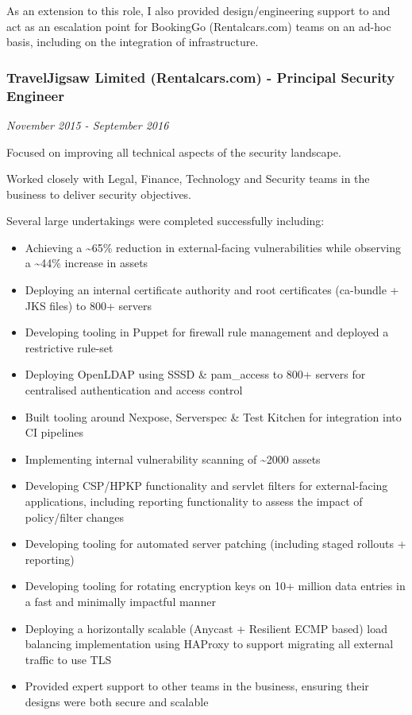 As an extension to this role, I also provided design/engineering support
to and act as an escalation point for BookingGo (Rentalcars.com) teams
on an ad-hoc basis, including on the integration of infrastructure.

\hypertarget{traveljigsaw-limited-rentalcars.com---principal-security-engineer}{%
\subsubsection{TravelJigsaw Limited (Rentalcars.com) - Principal
Security
Engineer}\label{traveljigsaw-limited-rentalcars.com---principal-security-engineer}}

\emph{November 2015 - September 2016}

Focused on improving all technical aspects of the security landscape.

Worked closely with Legal, Finance, Technology and Security teams in the
business to deliver security objectives.

Several large undertakings were completed successfully including:

\begin{itemize}
\tightlist
\item
  Achieving a \textasciitilde{}65\% reduction in external-facing
  vulnerabilities while observing a \textasciitilde{}44\% increase in
  assets
\item
  Deploying an internal certificate authority and root certificates
  (ca-bundle + JKS files) to 800+ servers
\item
  Developing tooling in Puppet for firewall rule management and deployed
  a restrictive rule-set
\item
  Deploying OpenLDAP using SSSD \& pam\_access to 800+ servers for
  centralised authentication and access control
\item
  Built tooling around Nexpose, Serverspec \& Test Kitchen for
  integration into CI pipelines
\item
  Implementing internal vulnerability scanning of \textasciitilde{}2000
  assets
\item
  Developing CSP/HPKP functionality and servlet filters for
  external-facing applications, including reporting functionality to
  assess the impact of policy/filter changes
\item
  Developing tooling for automated server patching (including staged
  rollouts + reporting)
\item
  Developing tooling for rotating encryption keys on 10+ million data
  entries in a fast and minimally impactful manner
\item
  Deploying a horizontally scalable (Anycast + Resilient ECMP based)
  load balancing implementation using HAProxy to support migrating all
  external traffic to use TLS
\item
  Provided expert support to other teams in the business, ensuring their
  designs were both secure and scalable
\end{itemize}


